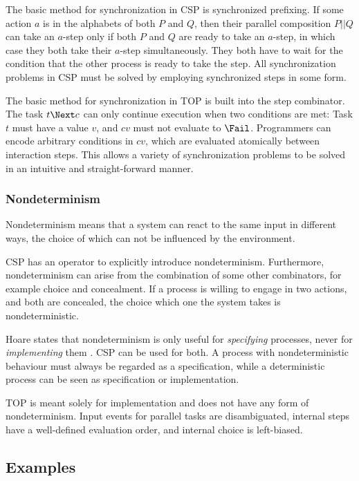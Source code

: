 The basic method for synchronization in CSP is synchronized prefixing.
If some action $a$ is in the alphabets of both $P$ and $Q$, then their parallel composition $P||Q$ can take an $a$-step only if both $P$ and $Q$ are ready to take an $a$-step, in which case they both take their $a$-step simultaneously.
They both have to wait for the condition that the other process is ready to take the step.
All synchronization problems in CSP must be solved by employing synchronized steps in some form.

The basic method for synchronization in TOP is built into the step combinator.
The task $t \Next c$ can only continue execution when two conditions are met:
Task $t$ must have a value $v$, and $cv$ must not evaluate to $\Fail$.
Programmers can encode arbitrary conditions in $cv$, which are evaluated atomically between interaction steps.
This allows a variety of synchronization problems to be solved in an intuitive and straight-forward manner.


\subsubsection*{Nondeterminism}

Nondeterminism means that a system can react to the same input in different ways, the choice of which can not be influenced by the environment.

CSP has an operator to explicitly introduce nondeterminism.
Furthermore, nondeterminism can arise from the combination of some other combinators, for example choice and concealment.
If a process is willing to engage in two actions, and both are concealed, the choice which one the system takes is nondeterministic.

Hoare states that nondeterminism is only useful for \emph{specifying} processes, never for \emph{implementing} them \cite{books/Hoare85CSP}.
CSP can be used for both.
A process with nondeterministic behaviour must always be regarded as a specification, while a deterministic process can be seen as specification or implementation.

TOP is meant solely for implementation and does not have any form of nondeterminism.
Input events for parallel tasks are disambiguated, internal steps have a well-defined evaluation order, and internal choice is left-biased.


\subsection{Examples}

